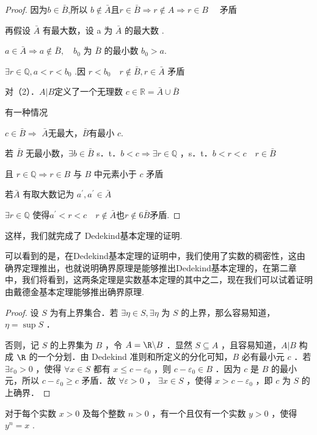 \begin{proof}
	因为$b \in \bar{B}$,所以 $b \notin \bar{A}$且$r \in \bar{B} \Rightarrow r \notin A \Rightarrow r \in B \quad$ 矛盾
	
	再假设 $\bar{A}$ 有最大数，设 a 为 $\bar{A}$ 的最大数 .
	
	$a \in \bar{A} \Rightarrow a \notin \bar{B} ,\quad b_0$ 为 $\bar{B}$ 的最小数 $b_0>a$.
	
	$\exists r \in \mathbb{Q}, a < r<b_0$ .因 $r<b_0 \quad r \notin \bar{B}, r \in \bar{A}$ 矛盾
	
	对（2）．$A|B$定义了一个无理数 $c \in \mathbb{R}=\bar{A} \cup \bar{B}$
	
	
	
	有一种情况
	
	$c \in \bar{B} \Rightarrow$ $\bar{A}$无最大，$\bar{B}$有最小 $c$.
	
	若 $\bar{B}$ 无最小数，$\exists b \in \bar{B}$ s．t．$b <c\Rightarrow \exists r \in \mathbb{Q}$ ，s．t．$b<r<c \quad r \in \bar{B}$
	
	且 $r \in \mathbb{Q} \Rightarrow r \in B$ 与 $B$ 中元素小于 $c$ 矛盾
	
	若$\bar{A}$ 有取大数记为 $a^{\prime},  a^{\prime} \in \bar{A} $ 
	
	$\exists r \in \mathbb{Q}$ 使得$a^{\prime}<r<c \quad r \notin \bar{A} \textbf{也} r \notin 6\bar{B} 
	$矛盾.
	
	
\end{proof}
这样，我们就完成了 Dedekind基本定理的证明.

可以看到的是，在Dedekind基本定理的证明中，我们使用了实数的稠密性，这由确界定理推出，也就说明确界原理是能够推出Dedekind基本定理的，在第二章中，我们将看到，这两条定理是实数基本定理的其中之二，现在我们可以试着证明由戴德金基本定理能够推出确界原理.
\begin{proof}
	设 $S$ 为有上界集合．若 $\exists \eta \in S, \exists \eta$ 为 $S$ 的上界，那么容易知道，$\eta=\sup S$ ．
	
	否则，记 $S$ 的上界集为 $B$ ，令 $A=\R \backslash B$ ．显然 $S \subseteq A$ ，且容易知道，$A| B$ 构成 $\R$ 的一个分划．由 Dedekind 准则和所定义的分化可知，$B$ 必有最小元 $c$ ．若 $\exists \varepsilon_0>0$ ，使得 $\forall x \in S$ 都有 $x \leqslant c-\varepsilon_0$ ，则 $c-\varepsilon_0 \in B$ ．因为 $c$ 是 $B$ 的最小元，所以 $c-\varepsilon_0 \geqslant c$ 矛盾．故 $\forall \varepsilon>0$ ， $\exists x \in S$ ，使得 $x>c-\varepsilon_0$ ，即 $c$ 为 $S$ 的上确界．
\end{proof}
\begin{proposition}
	\label{1.8.13}
	对于每个实数 $x>0$ 及每个整数 $n>0$ ，有一个且仅有一个实数 $y>0$ ，使得 $y^n=x$ .
\end{proposition}



